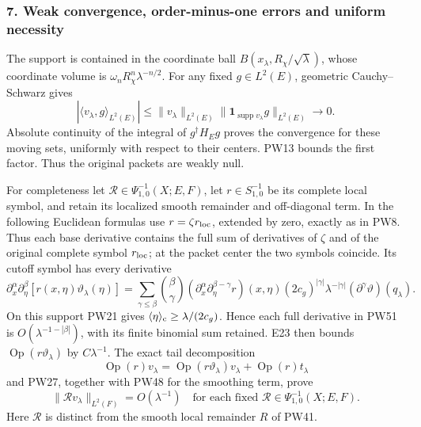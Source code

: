 \documentclass[
  11pt,
]{article}
\makeatletter
\let\ReaderOriginalAnchorStart\hyper@anchorstart
\let\ReaderOriginalAnchorEnd\hyper@anchorend
\let\ReaderPendingAliases\@empty
\def\ReaderArmAliases#1{\gdef\ReaderPendingAliases{#1}}
\def\hyper@anchorstart#1{\ReaderIfNativeAnchorTF{#1}{\ReaderPendingAliases\global\let\ReaderPendingAliases\@empty}{}\ReaderOriginalAnchorStart{#1}}
\makeatother
\begin{document}
\ReaderArmAliases{\ReaderOriginalAnchorStart{7-weak-convergence-order-minus-one-errors-and-uniform-necessity}\ReaderOriginalAnchorEnd\begingroup\expandafter\def\csname @currentHref\endcsname{7-weak-convergence-order-minus-one-errors-and-uniform-necessity}\label{7-weak-convergence-order-minus-one-errors-and-uniform-necessity}\endgroup}
\subsubsection{7. Weak convergence, order-minus-one errors and uniform
necessity}\label{weak-convergence-order-minus-one-errors-and-uniform-necessity}

The support is contained in the coordinate ball
\(B(x_\lambda,R_\chi/\sqrt\lambda)\), whose coordinate volume is
\(\omega_nR_\chi^n\lambda^{-n/2}\). For any fixed \(g\in L^2(E)\),
geometric Cauchy--Schwarz gives \[
 |\langle v_\lambda,g\rangle_{L^2(E)}|
 \leq \|v_\lambda\|_{L^2(E)}
       \|\mathbf1_{\operatorname{supp}v_\lambda}g\|_{L^2(E)}
       \longrightarrow0.
 \tag{PW50}
\] Absolute continuity of the integral of \(g^\dagger H_Eg\) proves the
convergence for these moving sets, uniformly with respect to their
centers. PW13 bounds the first factor. Thus the original packets are
weakly null.

For completeness let \(\mathcal R\in\Psi^{-1}_{1,0}(X;E,F)\), let
\(r\in S^{-1}_{1,0}\) be its complete local symbol, and retain its
localized smooth remainder and off-diagonal term. In the following
Euclidean formulas use \(r=\zeta r_{\rm loc}\), extended by zero,
exactly as in PW8. Thus each base derivative contains the full sum of
derivatives of \(\zeta\) and of the original complete symbol
\(r_{\rm loc}\); at the packet center the two symbols coincide. Its
cutoff symbol has every derivative \[
 \partial_x^\alpha\partial_\eta^\beta
       [r(x,\eta)\vartheta_\lambda(\eta)]
 =\sum_{\gamma\leq\beta}{\beta\choose\gamma}
       (\partial_x^\alpha\partial_\eta^{\beta-\gamma}r)(x,\eta)
       (2c_g)^{|\gamma|}\lambda^{-|\gamma|}
       (\partial^\gamma\vartheta)(q_\lambda).
 \tag{PW51}
\] On this support PW21 gives
\(\langle\eta\rangle_{\rm c}\geq\lambda/(2c_g)\). Hence each full
derivative in PW51 is \(O(\lambda^{-1-|\beta|})\), with its finite
binomial sum retained. E23 then bounds
\(\operatorname{Op}(r\vartheta_\lambda)\) by \(C\lambda^{-1}\). The
exact tail decomposition \[
 \operatorname{Op}(r)v_\lambda
      =\operatorname{Op}(r\vartheta_\lambda)v_\lambda
            +\operatorname{Op}(r)t_\lambda
 \tag{PW52}
\] and PW27, together with PW48 for the smoothing term, prove \[
 \|\mathcal Rv_\lambda\|_{L^2(F)}=O(\lambda^{-1})
 \quad\text{for each fixed }\mathcal R\in\Psi^{-1}_{1,0}(X;E,F).
 \tag{PW53}
\] Here \(\mathcal R\) is distinct from the smooth local remainder \(R\)
of PW41.
\end{document}
